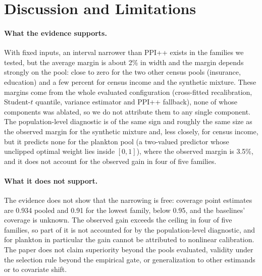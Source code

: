 \documentclass{article}
\begin{document}
\section{Discussion and Limitations}\label{sec:discussion}
\paragraph{What the evidence supports.} With fixed inputs, an interval narrower than PPI++ exists in the families we tested, but the average margin is about 2\% in width and the margin depends strongly on the pool: close to zero for the two other census pools (insurance, education) and a few percent for census income and the synthetic mixture. These margins come from the whole evaluated configuration (cross-fitted recalibration, Student-$t$ quantile, variance estimator and PPI++ fallback), none of whose components was ablated, so we do not attribute them to any single component. The population-level diagnostic is of the same sign and roughly the same size as the observed margin for the synthetic mixture and, less closely, for census income, but it predicts none for the plankton pool (a two-valued predictor whose unclipped optimal weight lies inside $[0,1]$), where the observed margin is 3.5\%, and it does not account for the observed gain in four of five families.

\paragraph{What it does not support.} The evidence does not show that the narrowing is free: coverage point estimates are 0.934 pooled and 0.91 for the lowest family, below 0.95, and the baselines' coverage is unknown. The observed gain exceeds the ceiling in four of five families, so part of it is not accounted for by the population-level diagnostic, and for plankton in particular the gain cannot be attributed to nonlinear calibration. The paper does not claim superiority beyond the pools evaluated, validity under the selection rule beyond the empirical gate, or generalization to other estimands or to covariate shift.
\end{document}
